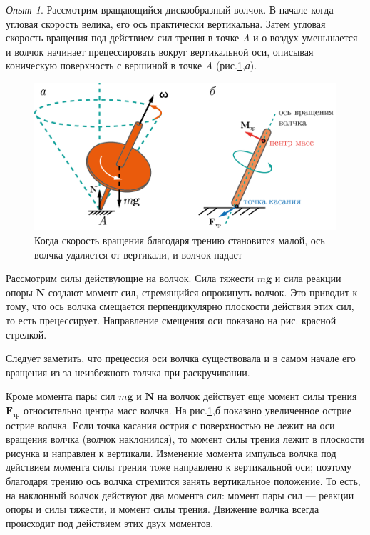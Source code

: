 \documentclass[14pt,a4paper,oneside]{extarticle}	%
\begin{document}
			\textit{Опыт 1}. Рассмотрим вращающийся дискообразный волчок.
			В начале когда угловая скорость велика, его ось практически вертикальна.
			Затем угловая скорость вращения под действием сил трения в точке  \textit{A} и о воздух уменьшается и волчок начинает прецессировать вокруг вертикальной оси, описывая коническую поверхность с вершиной в точке \textit{A} (рис.\ref{gyro-6},\textit{а}).
			
			\begin{figure}[H]	
				\centering 	
				\includegraphics[width=0.75\linewidth]{gyro-6.png}
				\caption{Когда скорость вращения благодаря трению становится малой, ось волчка удаляется от вертикали, и волчок падает}
				\label{gyro-6}
			\end{figure}
			
			Рассмотрим силы действующие на волчок.
			Сила тяжести $ m\textbf{g} $ и сила реакции опоры $ \textbf{N} $ создают момент сил, стремящийся опрокинуть волчок. Это приводит к тому, что ось волчка смещается перпендикулярно плоскости действия этих сил, то есть прецессирует.
			Направление смещения оси показано на рис. красной стрелкой.
			
			Следует заметить, что прецессия оси волчка существовала и в самом начале его вращения из-за неизбежного толчка при раскручивании.
			
			Кроме момента пары сил  $ m\textbf{g} $ и $ \textbf{N} $  на волчок действует еще момент силы трения $ \textbf{F}_{\text{тр}} $ относительно центра масс волчка.
			На рис.\ref{gyro-6},\textit{б} показано увеличенное острие острие волчка. 
			Если точка касания острия с поверхностью не лежит на оси вращения волчка (волчок наклонился), то момент силы трения лежит в плоскости рисунка и направлен к вертикали. Изменение момента импульса волчка под действием момента силы трения тоже направлено к вертикальной оси; поэтому благодаря трению ось волчка стремится занять вертикальное положение. 	
			То есть, на наклонный волчок действуют два момента сил: момент пары сил — реакции опоры и силы тяжести, и момент силы трения. Движение волчка всегда происходит под действием этих двух моментов.
					
\end{document}
